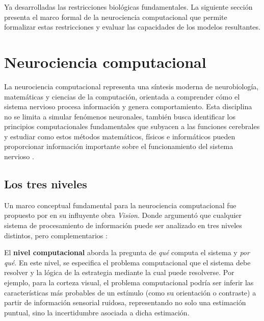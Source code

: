 Ya desarrolladas las restricciones biológicas fundamentales. La siguiente sección presenta el marco formal de la neurociencia computacional que permite formalizar estas restricciones y evaluar las capacidades de los modelos resultantes.


\section{Neurociencia computacional}
\label{sec:neuro_computacional}

La neurociencia computacional representa una síntesis moderna de neurobiología, matemáticas y ciencias de la computación, orientada a comprender cómo el sistema nervioso procesa información y genera comportamiento. Esta disciplina no se limita a simular fenómenos neuronales, también busca identificar los principios computacionales fundamentales que subyacen a las funciones cerebrales y estudiar como estos métodos matemáticos, físicos e informáticos pueden proporcionar información importante sobre el funcionamiento del sistema nervioso \citep{dayan2005theoretical}.

\subsection{Los tres niveles}
\label{subsec:marr_niveles}

Un marco conceptual fundamental para la neurociencia computacional fue propuesto por \citet{marr2010vision} en su influyente obra \textit{Vision}. Donde argumentó que cualquier sistema de procesamiento de información puede ser analizado en tres niveles distintos, pero complementarios \citep{marr2010vision}:

El \textbf{nivel computacional} aborda la pregunta de \textit{qué} computa el sistema y \textit{por qué}. En este nivel, se especifica el problema computacional que el sistema debe resolver y la lógica de la estrategia mediante la cual puede resolverse. Por ejemplo, para la corteza visual, el problema computacional podría ser inferir las características más probables de un estímulo (como su orientación o contraste) a partir de información sensorial ruidosa, representando no solo una estimación puntual, sino la incertidumbre asociada a dicha estimación.

